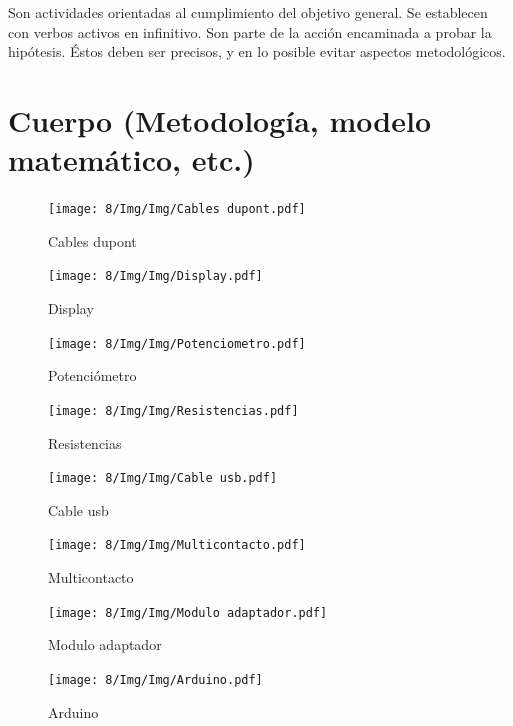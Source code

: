     Son actividades orientadas al cumplimiento del objetivo general. Se establecen con verbos activos en infinitivo. Son parte de la acción encaminada a probar la hipótesis. Éstos deben ser precisos, y en lo posible evitar aspectos metodológicos.
    \section{Cuerpo (Metodología, modelo matemático, etc.)}
    \begin{figure}[H]
        \centering
        \texttt{[image: 8/Img/Img/Cables dupont.pdf]}
        \caption{Cables dupont}
        \label{Cables dupont}
    \end{figure}
    
    \begin{figure}[H]
        \centering
        \texttt{[image: 8/Img/Img/Display.pdf]}
        \caption{Display}
        \label{Display}
    \end{figure}
    
    \begin{figure}[H]
        \centering
        \texttt{[image: 8/Img/Img/Potenciometro.pdf]}
        \caption{Potenciómetro}
        \label{potenciometro}
    \end{figure}
    
    \begin{figure}[H]
        \centering
        \texttt{[image: 8/Img/Img/Resistencias.pdf]}
        \caption{Resistencias}
        \label{Resistencias}
    \end{figure}
    
    \begin{figure}[H]
        \centering
        \texttt{[image: 8/Img/Img/Cable usb.pdf]}
        \caption{Cable usb}
        \label{Cable usb}
    \end{figure}
    
    \begin{figure}[H]
        \centering
        \texttt{[image: 8/Img/Img/Multicontacto.pdf]}
        \caption{Multicontacto}
        \label{Multicontacto}
    \end{figure}
    
    \begin{figure}[H]
        \centering
        \texttt{[image: 8/Img/Img/Modulo adaptador.pdf]}
        \caption{Modulo adaptador}
        \label{Modulo adaptador}
    \end{figure}
    
    \begin{figure}[H]
        \centering
        \texttt{[image: 8/Img/Img/Arduino.pdf]}
        \caption{Arduino}
        \label{Arduino}
    \end{figure}
    
